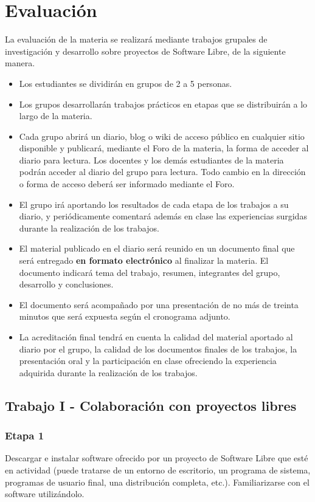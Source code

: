 
\section{Evaluación}
La evaluación de la materia se realizará mediante trabajos grupales de investigación y desarrollo sobre proyectos de Software Libre, de la siguiente manera.
\begin{itemize}
	\item Los estudiantes se dividirán en grupos de 2 a 5 personas. 
	\item Los grupos desarrollarán trabajos prácticos en etapas que se distribuirán a lo largo de la materia. 
	\item Cada grupo abrirá un diario, blog o wiki de acceso público en cualquier sitio disponible y publicará, mediante el Foro de la materia, la forma de acceder al diario para lectura. Los docentes y los demás estudiantes de la materia podrán acceder al diario del grupo para lectura. Todo cambio en la dirección o forma de acceso deberá ser informado mediante el Foro.
	\item El grupo irá aportando los resultados de cada etapa de los trabajos a su diario, y periódicamente comentará además en clase las experiencias surgidas durante la realización de los trabajos.
	\item El material publicado en el diario será reunido en un documento final que será entregado \textbf{en formato electrónico} al finalizar la materia. El documento indicará tema del trabajo, resumen, integrantes del grupo, desarrollo y conclusiones. 
	\item El documento será acompañado por una presentación de no más de treinta minutos que será expuesta según el cronograma adjunto. 
	\item La acreditación final tendrá en cuenta la calidad del material aportado al diario por el grupo, la calidad de los documentos finales de los trabajos, la presentación oral y la participación en clase ofreciendo la experiencia adquirida durante la realización de los trabajos.
\end{itemize}

\subsection {Trabajo I - Colaboración con proyectos libres}
\subsubsection{Etapa 1}  
Descargar e instalar software ofrecido por un proyecto de Software Libre que esté en actividad (puede tratarse de un entorno de escritorio, un programa de sistema, programas de usuario final, una distribución completa, etc.). Familiarizarse con el software utilizándolo. 
